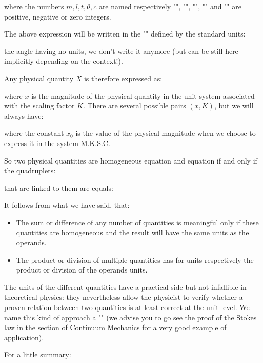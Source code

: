 	where the numbers $m,l,t,\theta,c$ are named respectively "", "", "", "" and "" are positive, negative or zero integers.
	
	The above expression will be written in the "" defined by the standard units:
	
	the angle having no units, we don't write it anymore (but can be still here implicitly depending on the context!).
	
	Any physical quantity $X$ is therefore expressed as:
	
	where $x$ is the magnitude of the physical quantity in the unit system associated with the scaling factor $K$. There are several possible pairs $(x, K)$, but we will always have:
	
	where the constant $x_0$ is the value of the physical magnitude when we choose to express it in the system M.K.S.C.
	
	So two physical quantities are homogeneous equation and equation if and only if the quadruplets:
	
	that are linked to them are equals:
	
	It follows from what we have said, that:
	\begin{itemize}
		\item The sum or difference of any number of quantities is meaningful only if these quantities are homogeneous and the result will have the same units as the operands.

		\item The product or division of multiple quantities has for units respectively the product or division of the operands units.
	\end{itemize}
	\begin{tcolorbox}[title=Remark,colframe=black,arc=10pt]
	 The units of the different quantities have a practical side but not infallible in theoretical physics: they nevertheless allow the physicist to verify whether a proven relation between two quantities is at least correct at the unit level. We name this kind of approach a "" (we advise you to go see the proof of the Stokes law in the section of Continuum Mechanics for a very good example of application).
	\end{tcolorbox}
	
	\pagebreak
	For a little summary:
	
